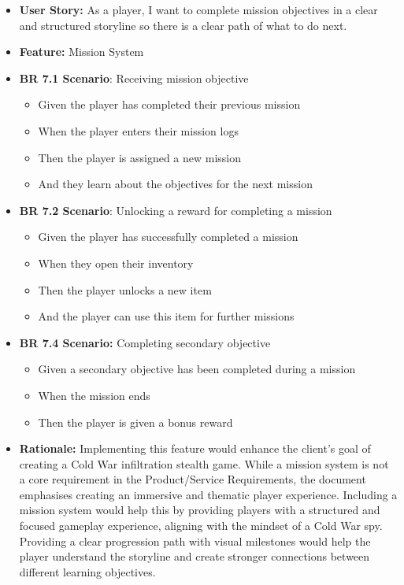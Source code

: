 \documentclass[11pt, a4paper]{article}
\begin{document}
\begin{itemize}
    \item \textbf{User Story:} As a player, I want to complete mission objectives in a clear and structured storyline so there is a clear path of what to do next.

    \item \textbf{Feature:} Mission System

    \item \textbf{BR 7.1 Scenario}: Receiving mission objective

          \begin{itemize}
              \item Given the player has completed their previous mission
              \item When the player enters their mission logs
              \item Then the player is assigned a new mission
              \item And they learn about the objectives for the next mission
          \end{itemize}

    \item \textbf{BR 7.2 Scenario}: Unlocking a reward for completing a mission

          \begin{itemize}
              \item Given the player has successfully completed a mission
              \item When they open their inventory
              \item Then the player unlocks a new item
              \item And the player can use this item for further missions
          \end{itemize}

    \item \textbf{BR 7.4 Scenario:} Completing secondary objective

          \begin{itemize}
              \item Given a secondary objective has been completed during a mission
              \item When the mission ends
              \item Then the player is given a bonus reward
          \end{itemize}

    \item \textbf{Rationale:} Implementing this feature would enhance the client’s goal of creating a Cold War infiltration stealth game. While a mission system is not a core requirement in the Product/Service Requirements, the document emphasises creating an immersive and thematic player experience. Including a mission system would help this by providing players with a structured and focused gameplay experience, aligning with the mindset of a Cold War spy. Providing a clear progression path with visual milestones would help the player understand
          the storyline and create stronger connections between different learning objectives.


\end{itemize}
\end{document}
